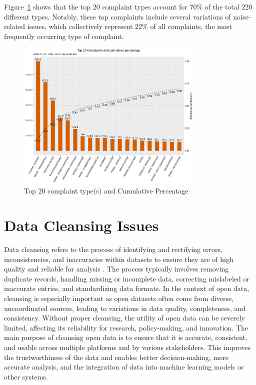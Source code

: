 \documentclass[linenumber]{jdsart}
\begin{document}
Figure~\ref{fig:SR_complaints} shows that the top 20 complaint 
types account for 70\% of the total 220 different types. Notably, 
these top complaints include several variations of noise-related 
issues, which collectively represent 22\% of all complaints, the 
most frequently occurring type of complaint.

\begin{figure}[tbp]
 \centering
  \includegraphics[width=0.8\textwidth]{SR_by_Complaint_Type.pdf} 
  \caption{Top 20 complaint type(s) and Cumulative Percentage} 
  \label{fig:SR_complaints}
\end{figure}


\section{Data Cleansing Issues} 
\label{sec:issues}

Data cleansing refers to the process of identifying and rectifying
errors, inconsistencies, and inaccuracies within datasets to ensure
they are of high quality and reliable for analysis
\citep{maletic2005data, hosseinzadeh2023data}. The process
typically involves removing duplicate records, handling missing or
incomplete data, correcting mislabeled or inaccurate entries, and
standardizing data formats. In the context of open data, cleansing is
especially important as open datasets often come from diverse,
uncoordinated sources, leading to variations in data quality,
completeness, and consistency. Without proper cleansing, the utility
of open data can be severely limited, affecting its reliability for
research, policy-making, and innovation. The main purpose of cleansing
open data is to ensure that it is accurate, consistent, and usable
across multiple platforms and by various stakeholders. This improves
the trustworthiness of the data and enables better decision-making,
more accurate analysis, and the integration of data into machine
learning models or other systems.
\end{document}
